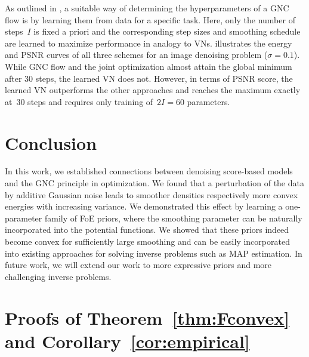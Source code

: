 \documentclass{article}
\theoremstyle{plain}
\theoremstyle{definition}
\theoremstyle{remark}
\begin{document}
As outlined in , a suitable way of determining the hyperparameters of a GNC flow is by learning them from data for a specific task.
Here, only the number of steps~$I$ is fixed a priori and the corresponding step sizes and smoothing schedule are learned to maximize performance in analogy to VNs.
 illustrates the energy and PSNR curves of all three schemes for an image denoising problem ($\sigma=0.1$).
While GNC flow and the joint optimization almost attain the global minimum after $30$ steps, the learned VN does not.
However, in terms of PSNR score, the learned VN outperforms the other approaches and reaches the maximum exactly at~$30$ steps and requires only training of~$2I=60$ parameters.

\section{Conclusion}
In this work, we established connections between denoising score-based models and the GNC principle in optimization.
We found that a perturbation of the data by additive Gaussian noise leads to smoother densities respectively more convex energies with increasing variance.
We demonstrated this effect by learning a one-parameter family of FoE priors, where the smoothing parameter can be naturally incorporated into the potential functions.
We showed that these priors indeed become convex for sufficiently large smoothing and can be easily incorporated into existing approaches for solving inverse problems such as MAP estimation.
In future work, we will extend our work to more expressive priors and more challenging inverse problems.






\newpage
\appendix
\onecolumn

\section{Proofs of Theorem~\ref{thm:Fconvex} and Corollary~\ref{cor:empirical}} \label{apdx:proofs}
\end{document}
